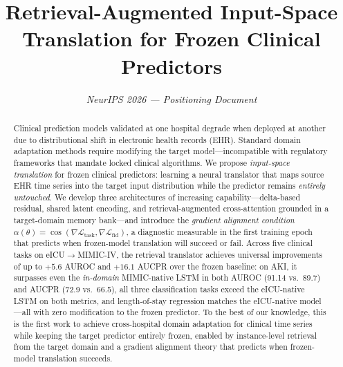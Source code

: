 \documentclass[10pt]{article}
\title{\Large\bfseries Retrieval-Augmented Input-Space Translation for Frozen Clinical Predictors}
\author{
  \textit{NeurIPS 2026 --- Positioning Document}
}
\date{}
\begin{document}
\maketitle
\vspace{-10pt}

\begin{abstract}
\noindent\small
Clinical prediction models validated at one hospital degrade when deployed at another due to distributional shift in electronic health records (EHR).
Standard domain adaptation methods require modifying the target model---incompatible with regulatory frameworks that mandate locked clinical algorithms.
We propose \emph{input-space translation} for frozen clinical predictors: learning a neural translator that maps source EHR time series into the target input distribution while the predictor remains \emph{entirely untouched}.
We develop three architectures of increasing capability---delta-based residual, shared latent encoding, and retrieval-augmented cross-attention grounded in a target-domain memory bank---and introduce the \emph{gradient alignment condition} $\alpha(\theta) = \cos(\nabla\mathcal{L}_{\text{task}}, \nabla\mathcal{L}_{\text{fid}})$, a diagnostic measurable in the first training epoch that predicts when frozen-model translation will succeed or fail.
Across five clinical tasks on eICU$\to$MIMIC-IV, the retrieval translator achieves universal improvements of up to $+5.6$ AUROC and $+16.1$ AUCPR over the frozen baseline: on AKI, it surpasses even the \emph{in-domain} MIMIC-native LSTM in both AUROC (91.14 vs.\ 89.7) and AUCPR (72.9 vs.\ 66.5), all three classification tasks exceed the eICU-native LSTM on both metrics, and length-of-stay regression matches the eICU-native model---all with zero modification to the frozen predictor.
To the best of our knowledge, this is the first work to achieve cross-hospital domain adaptation for clinical time series while keeping the target predictor entirely frozen, enabled by instance-level retrieval from the target domain and a gradient alignment theory that predicts when frozen-model translation succeeds.
\end{abstract}

\vspace{-6pt}







{\small

}
\end{document}
